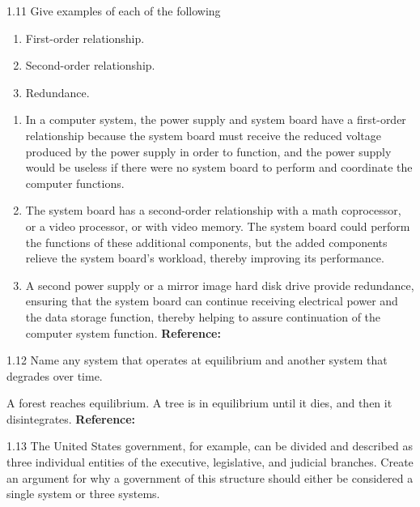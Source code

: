 \begin{exsol@exercise}{1.11}
    \label{sea-1-13}
        Give examples of each of the following
        \begin{enumerate}[label=\alph*)]
            \item First-order relationship.
            \item Second-order relationship.
            \item Redundance.
        \end{enumerate}
\end{exsol@exercise}
\begin{exsol@solution}{}
        \begin{enumerate}[label=\alph*)]
            \item In a computer system, the power supply and system board have a first-order relationship because the system board must receive the reduced voltage produced by the power supply in order to function, and the power supply would be useless if there were no system board to perform and coordinate the computer functions.
            \item The system board has a second-order relationship with a math coprocessor, or a video processor, or with video memory. The system board could perform the functions of these additional components, but the added components relieve the system board’s workload, thereby improving its performance.
            \item  A second power supply or a mirror image hard disk drive provide redundance, ensuring that the system board can continue receiving electrical power and the data storage function, thereby helping to assure continuation of the computer system function. \textbf{Reference:}
        \end{enumerate}
\end{exsol@solution}
\begin{exsol@exercise}{1.12}
    \label{sea-1-16}
        Name any system that operates at equilibrium and another system that degrades over time.
\end{exsol@exercise}
\begin{exsol@solution}{}
        A forest reaches equilibrium. A tree is in equilibrium until it dies, and then it disintegrates. \textbf{Reference:}
\end{exsol@solution}
\begin{exsol@exercise}{1.13}
    \label{sea-1-17}
        The United States government, for example, can be divided and described as three individual entities of the executive, legislative, and judicial branches. Create an argument for why a government of this structure should either be considered a single system or three systems.
\end{exsol@exercise}
